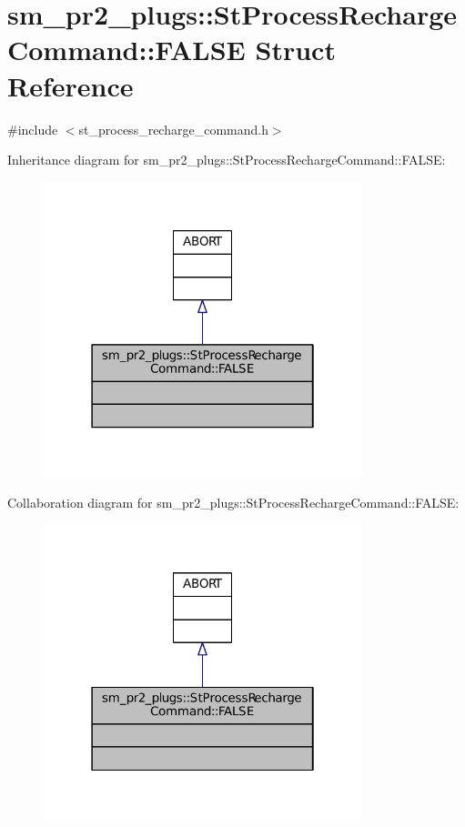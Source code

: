 \hypertarget{structsm__pr2__plugs_1_1StProcessRechargeCommand_1_1FALSE}{}\section{sm\+\_\+pr2\+\_\+plugs\+:\+:St\+Process\+Recharge\+Command\+:\+:F\+A\+L\+SE Struct Reference}
\label{structsm__pr2__plugs_1_1StProcessRechargeCommand_1_1FALSE}


{\ttfamily \#include $<$st\+\_\+process\+\_\+recharge\+\_\+command.\+h$>$}



Inheritance diagram for sm\+\_\+pr2\+\_\+plugs\+:\+:St\+Process\+Recharge\+Command\+:\+:F\+A\+L\+SE\+:
\nopagebreak
\begin{figure}[H]
\begin{center}
\leavevmode
\includegraphics[width=262pt]{structsm__pr2__plugs_1_1StProcessRechargeCommand_1_1FALSE__inherit__graph}
\end{center}
\end{figure}


Collaboration diagram for sm\+\_\+pr2\+\_\+plugs\+:\+:St\+Process\+Recharge\+Command\+:\+:F\+A\+L\+SE\+:
\nopagebreak
\begin{figure}[H]
\begin{center}
\leavevmode
\includegraphics[width=262pt]{structsm__pr2__plugs_1_1StProcessRechargeCommand_1_1FALSE__coll__graph}
\end{center}
\end{figure}


